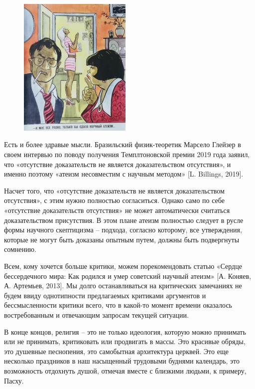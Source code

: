 \begin{figure}
    \includegraphics[width=0.48\textwidth]{img/atheism-4.jpg}
\end{figure}
Есть и более здравые мысли. Бразильский физик-теоретик Марсело Глейзер в своем интервью по поводу получения Темплтоновской премии 2019 года заявил, что «отсутствие доказательств не является доказательством отсутствия», и именно поэтому «атеизм несовместим с научным методом» [L. Billings, 2019].

Насчет того, что «отсутствие доказательств не является доказательством отсутствия», с этим нужно полностью согласиться. Однако само по себе «отсутствие доказательств отсутствия» не может автоматически считаться доказательством присутствия. В этом плане атеизм полностью следует в русле формы научного скептицизма – подхода, согласно которому, все утверждения, которые не могут быть доказаны опытным путем, должны быть подвергнуты сомнению.

Всем, кому хочется больше критики, можем порекомендовать статью «Сердце бессердечного мира: Как родился и умер советский научный атеизм» [А. Коняев, А. Артемьев, 2013]. Мы долго останавливаться на критических замечаниях не будем ввиду однотипности предлагаемых критиками аргументов и бессмысленности критики всего, что в какой-то момент времени оказалось востребованным и отвечающим запросам текущей ситуации.

В конце концов, религия – это не только идеология, которую можно принимать или не принимать, критиковать или продвигать в массы. Это красивые обряды, это душевные песнопения, это самобытная архитектура церквей. Это еще несколько праздников в наш насыщенный трудовыми буднями календарь, это возможность отдохнуть душой, отмечая вместе с близкими людьми, к примеру, Пасху.

